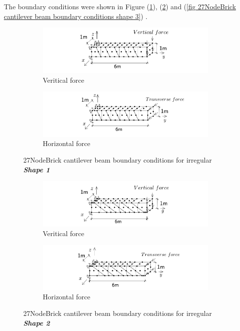 \documentclass[fleqn,11pt]{article}
\begin{document}
The boundary conditions were shown in Figure (\ref{fig 27NodeBrick cantilever beam boundary conditions shape 1}), (\ref{fig 27NodeBrick cantilever beam boundary conditions shape 2}) and (\ref{fig 27NodeBrick cantilever beam boundary conditions shape 3}) .

\begin{figure}[H]
  \centering
    \begin{subfigure}{0.5\textwidth}
      \centering
      \includegraphics[width=9cm]{../Figure-files/beam_brick27_shape1_vertical.pdf}
      \caption{Veritical force}
    \end{subfigure}
    \begin{subfigure}{0.5\textwidth}
      \centering
      \includegraphics[width=9cm]{../Figure-files/beam_brick27_shape1_horizontal.pdf}
      \caption{Horizontal force}
    \end{subfigure}
  \caption{27NodeBrick cantilever beam boundary conditions for irregular \textbf{\emph{Shape 1}} }
  \label{fig 27NodeBrick cantilever beam boundary conditions shape 1}
\end{figure}


\begin{figure}[H]
  \centering
    \begin{subfigure}{0.5\textwidth}
      \centering
      \includegraphics[width=9cm]{../Figure-files/beam_brick27_shape2_vertical.pdf}
      \caption{Veritical force}
    \end{subfigure}
    \begin{subfigure}{0.5\textwidth}
      \centering
      \includegraphics[width=9cm]{../Figure-files/beam_brick27_shape2_horizontal.pdf}
      \caption{Horizontal force}
    \end{subfigure}
  \caption{27NodeBrick cantilever beam boundary conditions for irregular \textbf{\emph{Shape 2}} }
  \label{fig 27NodeBrick cantilever beam boundary conditions shape 2}
\end{figure}
\end{document}
